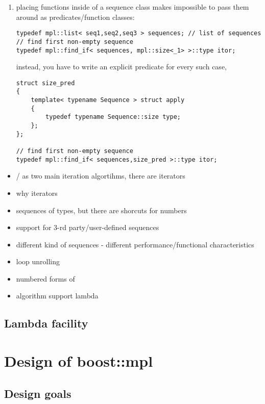 \documentclass{netobjectdays}
\begin{document}
\begin{enumerate}
\item placing functions inside of a sequence class makes 
impossible to pass them around as predicates/function classes: 

{\footnotesize
\begin{verbatim}
typedef mpl::list< seq1,seq2,seq3 > sequences; // list of sequences
// find first non-empty sequence
typedef mpl::find_if< sequences, mpl::size<_1> >::type itor;
\end{verbatim}
}

instead, you have to write an explicit predicate for every such case, 

{\footnotesize
\begin{verbatim}
struct size_pred
{
    template< typename Sequence > struct apply
    {
        typedef typename Sequence::size type;
    };
};

// find first non-empty sequence
typedef mpl::find_if< sequences,size_pred >::type itor;
\end{verbatim}
}

\end{enumerate}

 
\begin{itemize}
  \item {}/ as two main 
    iteration algortihms, there are iterators
  \item why iterators 
  \item  sequences of types, but there are shorcuts for numbers
  \item support for 3-rd party/user-defined sequences
  \item  different kind of sequences - different 
    performance/functional characteristics
  \item loop unrolling
  \item numbered forms of 
  \item algorithm support lambda
\end{itemize}


\subsection{Lambda facility}

\section{Design of boost::mpl}
\subsection{Design goals}
\end{document}
